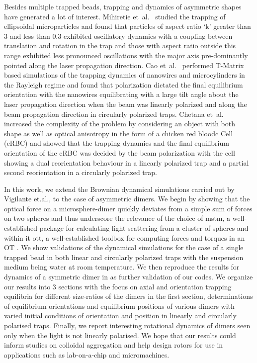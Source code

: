 \documentclass[preprint,  3p]{elsarticle}
\begin{document}
Besides multiple trapped beads, trapping and dynamics of asymmetric
shapes have generated a lot of interest.  Mihiretie et~al.\
\cite{Loudet_2014} studied the trapping of ellipsoidal microparticles
and found that particles of aspect ratio ‘k’ greater than $3$ and less
than $0.3$ exhibited oscillatory dynamics with a coupling between
translation and rotation in the trap and those with aspect ratio
outside this range exhibited less pronounced oscillations with the
major axis pre-dominantly pointed along the laser propagation
direction.  Cao et~al.\ \cite{Curran_1999} performed T-Matrix based
simulations of the trapping dynamics of nanowires and microcylinders
in the Rayleigh regime and found that polarization dictated the final
equilibrium orientation with the nanowires equilibrating with a large
tilt angle about the laser propagation direction when the beam was
linearly polarized and along the beam propagation direction in
circularly polarized traps.  Chetana et~al.\ \cite{Chetana_2022}
increased the complexity of the problem by considering an object with
both shape as well as optical anisotropy in the form of a chicken red
bloodc Cell (cRBC) and showed that the trapping dynamics and the final
equilibrium orientation of the cRBC was decided by the beam
polarization with the cell showing a dual reorientation behaviour in a
linearly polarized trap and a partial second reorientation in a
circularly polarized trap.

In this work, we extend the Brownian dynamical simulations carried out by Vigilante et.al., \cite{Vigilante_2020} to the case of asymmetric dimers. We begin by showing that the optical force on a microsphere-dimer quickly deviates from a simple sum of forces on two spheres and thus underscore the relevance of the choice of mstm, a well-established package for calculating light scattering from a cluster of spheres \cite{Mackowski_2011} and within it ott, a well-established toolbox for computing forces and torques in an OT \cite{Nieminen_2007}.  We show validations of the dynamical simulations for the case of a single trapped bead in both linear and circularly polarized traps with the suspension medium being water at room temperature. We then reproduce the results for dynamics of a symmetric dimer in \cite{Vigilante_2020} as further validation of our codes. We organize our results into 3 sections with the focus on axial and orientation trapping equilibria for different size-ratios of the dimers in the first section, determinations of equilibrium orientations and equilibrium positions of various dimers with varied initial conditions of orientation and position in linearly and circularly polarised traps.  Finally, we report interesting rotational dynamics of dimers seen only when the light is not linearly polarised. We hope that our results could inform studies on colloidal aggregation and help design rotors for use in applications such as lab-on-a-chip and micromachines.        
\end{document}
